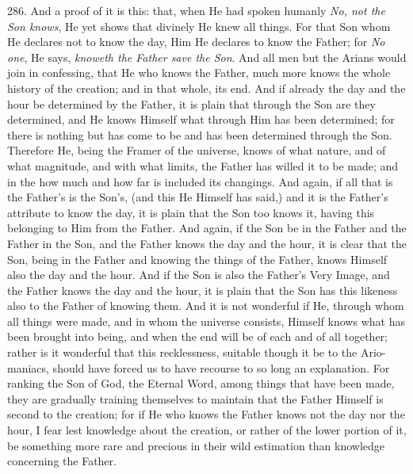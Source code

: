 286.
And a proof of it is this: that, when He had spoken humanly \emph{No, not
the Son knows}, He yet shows that divinely He knew all things. For
that Son whom He declares not to know the day, Him He declares to know
the Father; for \emph{No one}, He says, \emph{knoweth the Father save the
Son}. And all men but the Arians would join in confessing, that He
who knows the Father, much more knows the whole history of the
creation; and in that whole, its end. And if already the day and the
hour be determined by the Father, it is plain that through the Son are
they determined, and He knows Himself what through Him has been
determined; for there is nothing but has come to be and has been
determined through the Son. Therefore He, being the Framer of the
universe, knows of what nature, and of what magnitude, and with what limits, the Father has willed it to be made; and in the how much
and how far is included its changings. And again, if all that is the
Father's is the Son's, (and this He Himself has said,) and it is the
Father's attribute to know the day, it is plain that the Son too knows
it, having this belonging to Him from the Father. And again, if the
Son be in the Father and the Father in the Son, and the Father knows
the day and the hour, it is clear that the Son, being in the Father
and knowing the things of the Father, knows Himself also the day and
the hour. And if the Son is also the Father's Very Image, and the
Father knows the day and the hour, it is plain that the Son has this
likeness also to the Father of knowing them. And it is not wonderful
if He, through whom all things were made, and in whom the universe
consists, Himself knows what has been brought into being, and when the
end will be of each and of all together; rather is it wonderful that
this recklessness, suitable though it be to the Ario-maniacs, should
have forced us to have recourse to so long an explanation. For ranking
the Son of God, the Eternal Word, among things that have been made,
they are gradually training themselves to maintain that the Father
Himself is second to the creation; for if He who knows the Father
knows not the day nor the hour, I fear lest knowledge about the
creation, or rather of the lower portion of it, be something more rare
and precious in their wild estimation than knowledge concerning the
Father.


